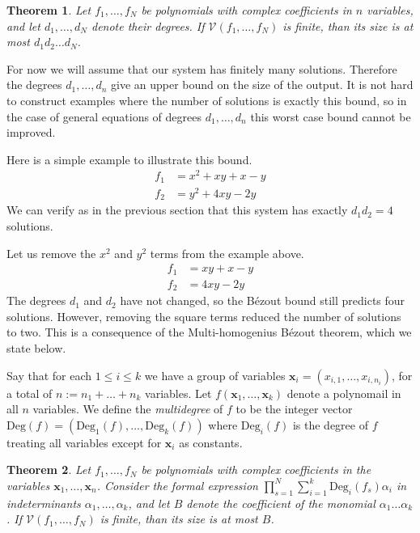\documentclass[12pt]{article}
\newtheorem{theorem}{Theorem}[section]
\newcommand{\Deg}{\text{Deg}}
\begin{document}
\begin{theorem}
Let $f_1, \ldots, f_N$ be polynomials with complex coefficients in $n$ 
variables, and let $d_1, \ldots, d_N$ denote their degrees. If 
$\mathcal{V}(f_1, \ldots, f_N)$ is finite, than its size is at most 
$d_1d_2 \ldots d_N$. 
\end{theorem}

For now we will assume that our system has finitely many solutions.
Therefore the degrees $d_1, \ldots, d_n$ give an upper bound on the size 
of the output. It is not hard to construct examples where the number of 
solutions is exactly this bound, so in the case of general equations of 
degrees $d_1, \ldots, d_n$ this worst case bound cannot be improved.

Here is a simple example to illustrate this bound.
\begin{align*}
    f_1 &= x^2 + xy + x - y\\
    f_2 &= y^2 + 4xy - 2y
\end{align*}
We can verify as in the previous section that this system has exactly 
$d_1d_2 = 4$ solutions.

Let us remove the $x^2$ and $y^2$ terms from the example above.
\begin{align*}
    f_1 &= xy + x - y\\
    f_2 &= 4xy - 2y
\end{align*}
The degrees $d_1$ and $d_2$ have not changed, so the B\'{e}zout bound 
still predicts four solutions. However, removing the square terms 
reduced the number of solutions to two. This is a consequence of the 
Multi-homogenius B\'{e}zout theorem, which we state below.

Say that for each $1 \leq i \leq k$ we have a group of variables 
$\mathbf{x}_i = (x_{i,1}, \ldots, x_{i,n_i})$, for a total of $n := n_1 
+ \ldots + n_k$ variables. Let $f(\mathbf{x}_1, \ldots, 
\mathbf{x}_k)$ denote a polynomail in all $n$ variables. We define the 
\emph{multidegree} of $f$ to be the integer vector $\Deg(f) = 
(\Deg_1(f), \ldots, \Deg_k(f))$ where $\Deg_i(f)$ is the degree of $f$ 
treating all variables except for $\mathbf{x}_i$ as constants.

\begin{theorem}
Let $f_1, \ldots, f_N$ be polynomials with complex coefficients in the 
   variables $\mathbf{x}_1, 
\ldots, \mathbf{x}_n$. Consider the formal expression $\prod_{s = 1}^N 
\sum_{i = 1}^{k} \Deg_i(f_s) \alpha_i$ in indeterminants $\alpha_1, 
\ldots, \alpha_k$, and let $B$ denote the coefficient of the monomial 
$\alpha_1\ldots \alpha_k$. If $\mathcal{V}(f_1, \ldots, f_N)$ is finite, 
than its size is at most $B$.
\end{theorem}
\end{document}
